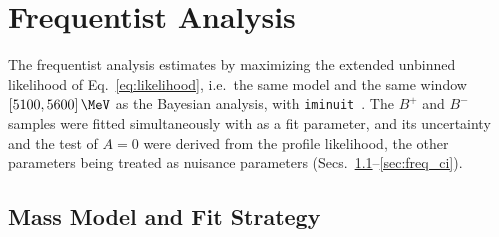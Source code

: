\section{Frequentist Analysis}
\label{sec:frequentist}

The frequentist analysis estimates \Araw by maximizing the extended unbinned likelihood of Eq.~\eqref{eq:likelihood}, i.e.\ the same model and the same window $[5100,5600]\,\MeV$ as the Bayesian analysis, with \texttt{iminuit}~\cite{iminuit}. The $B^+$ and $B^-$ samples were fitted simultaneously with \Araw as a fit parameter, and its uncertainty and the test of $A=0$ were derived from the profile likelihood, the other parameters being treated as nuisance parameters (Secs.~\ref{sec:freq_model}--\ref{sec:freq_ci}).


\subsection{Mass Model and Fit Strategy}
\label{sec:freq_model}

